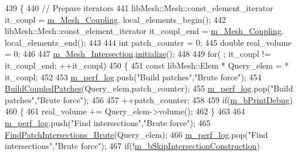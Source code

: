 \begin{DoxyCode}
439     \{
440         \textcolor{comment}{// Prepare iterators}
441         libMesh::Mesh::const\_element\_iterator it\_coupl = \hyperlink{classcarl_1_1_intersection___search_adb13a40afa6c1f8db7bb33f68c5b42d2}{m\_Mesh\_Coupling}.
      local\_elements\_begin();
442         libMesh::Mesh::const\_element\_iterator it\_coupl\_end = \hyperlink{classcarl_1_1_intersection___search_adb13a40afa6c1f8db7bb33f68c5b42d2}{m\_Mesh\_Coupling}.
      local\_elements\_end();
443 
444         \textcolor{keywordtype}{int} patch\_counter = 0;
445         \textcolor{keywordtype}{double} real\_volume = 0;
446 
447         \hyperlink{classcarl_1_1_intersection___search_a4946b764d66e3f26f323c5d043551c66}{m\_Mesh\_Intersection}.\hyperlink{classcarl_1_1_mesh___intersection_a195605fd295d5afc638129309103f576}{initialize}();
448 
449         \textcolor{keywordflow}{for}( ; it\_coupl != it\_coupl\_end; ++it\_coupl)
450         \{
451             \textcolor{keyword}{const} libMesh::Elem * Query\_elem = * it\_coupl;
452 
453             \hyperlink{classcarl_1_1_intersection___search_aebe6210287a36909206b1a59f9cd17e0}{m\_perf\_log}.push(\textcolor{stringliteral}{"Build patches"},\textcolor{stringliteral}{"Brute force"});
454             \hyperlink{classcarl_1_1_intersection___search_a00e012de151310737c771ee7b15c9b2c}{BuildCoupledPatches}(Query\_elem,patch\_counter);
455             \hyperlink{classcarl_1_1_intersection___search_aebe6210287a36909206b1a59f9cd17e0}{m\_perf\_log}.pop(\textcolor{stringliteral}{"Build patches"},\textcolor{stringliteral}{"Brute force"});
456 
457             ++patch\_counter;
458 
459             \textcolor{keywordflow}{if}(\hyperlink{classcarl_1_1_intersection___search_af69485e014f8178ec6c6dcbd95bf9dc9}{m\_bPrintDebug})
460             \{
461                 real\_volume += Query\_elem->volume();
462             \}
463 
464             \hyperlink{classcarl_1_1_intersection___search_aebe6210287a36909206b1a59f9cd17e0}{m\_perf\_log}.push(\textcolor{stringliteral}{"Find intersections"},\textcolor{stringliteral}{"Brute force"});
465             \hyperlink{classcarl_1_1_intersection___search_ad91e556edabe62c1b0b5d30e3fc3bcef}{FindPatchIntersections\_Brute}(Query\_elem);
466             \hyperlink{classcarl_1_1_intersection___search_aebe6210287a36909206b1a59f9cd17e0}{m\_perf\_log}.pop(\textcolor{stringliteral}{"Find intersections"},\textcolor{stringliteral}{"Brute force"});
467             \textcolor{keywordflow}{if}(!\hyperlink{classcarl_1_1_intersection___search_aef626956ac007f4c737aba3f2f69f2de}{m\_bSkipIntersectionConstruction})

\end{DoxyCode}
